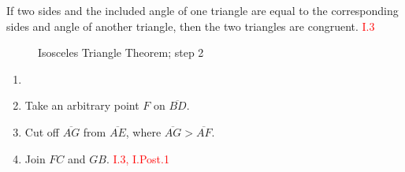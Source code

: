 \begin{lemma}
If two sides and the included angle of one triangle are equal to the corresponding sides and angle of another triangle, then the two triangles are congruent.\hfill\textcolor{red}{ I.3}
\end{lemma}

\begin{figure}[H]
\centering
	\caption{Isosceles Triangle Theorem; step 2}
\end{figure}
    
\clearpage
    
\begin{con}
	\begin{enumerate}
	\item[]
    		\item Take an arbitrary point $F$ on $\overline{BD}$.
    		\item Cut off $\overline{AG}$ from $\overline{AE}$,  where $\overline{AG} > \overline{AF}$.
    		\item Join $FC$ and $GB$.\hfill\textcolor{red}{ I.3, I.Post.1}
	\end{enumerate}
\end{con}

